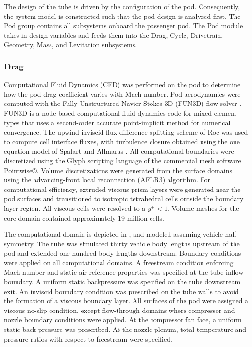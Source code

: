 
     The design of the tube is driven by the configuration of the pod.
     Consequently, the system model is constructed such that the pod design is analyzed first.
     The Pod group contains all subsystems onboard the passenger pod.
     The Pod module takes in design variables and feeds them into the Drag, Cycle,
     Drivetrain, Geometry, Mass, and Levitation subsystems.

  \subsubsection{Drag}
    Computational Fluid Dynamics (CFD) was performed on the pod to determine
    how the pod drag coefficient varies with Mach number.
    Pod aerodynamics were computed with the Fully Unstructured Navier-Stokes 3D
    (FUN3D) flow solver \cite{Biedron}. FUN3D is a node-based computational fluid dynamics
    code for mixed element types that uses a second-order accurate point-implicit
    method for numerical convergence. The upwind inviscid flux difference
    splitting scheme of Roe \cite{Roe} was used to compute cell interface fluxes,
    with turbulence closure obtained using the one equation model of Spalart
    and Allmaras \cite{Spalart}.
    All computational boundaries were discretized using the Glyph scripting
    language of the commercial mesh software Pointwise®. Volume discretizations
    were generated from the surface domains using the advancing-front local
    reconnection (AFLR3)\cite{Marcum} algorithm. For computational efficiency, extruded
    viscous prism layers were generated near the pod surfaces and transitioned
    to isotropic tetrahedral cells outside the boundary layer region.
    All viscous cells were resolved to a $y^{+} < 1$. Volume meshes for the core
    domain contained approximately 19 million cells.

    The computational domain is depicted in ,
    and modeled assuming vehicle half-symmetry.
    The tube was simulated thirty vehicle body lengths upstream of the pod
    and extended one hundred body lengths downstream. Boundary conditions were
    applied on all computational domains. A freestream condition enforcing Mach
    number and static air reference properties was specified at the tube inflow boundary.
    A uniform static backpressure was specified on the tube downstream exit.
    An inviscid boundary condition was prescribed on the tube walls to avoid
    the formation of a viscous boundary layer. All surfaces of the pod were
    assigned a viscous no-slip condition, except flow-through domains where
    compressor and nozzle boundary conditions were applied. At the compressor
    fan face, a uniform static back-pressure was prescribed. At the nozzle plenum,
    total temperature and pressure ratios with respect to freestream were specified.

